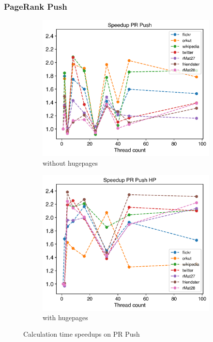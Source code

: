 \subsubsection{PageRank Push}
\begin{figure}
	\hfil
	\begin{subfigure}{0.4\textwidth}
		\includegraphics[width=\linewidth]{../../plots/singleNodePRPushGaloisThreads.png}
		\caption{without hugepages}
		\label{fig:galoisSpeedupPRPush_noHP}
	\end{subfigure}
	\begin{subfigure}{0.4\textwidth}
		\includegraphics[width=\linewidth]{../../plots/singleNodePRPushGaloisHPThreads.png}
		\caption{with hugepages}
		\label{fig:galoisSpeedupPRPush_HP}
	\end{subfigure}
	\hfil
	\caption{Calculation time speedups on PR Push}
	\label{fig:galoisSpeedupPRPush}
\end{figure}
